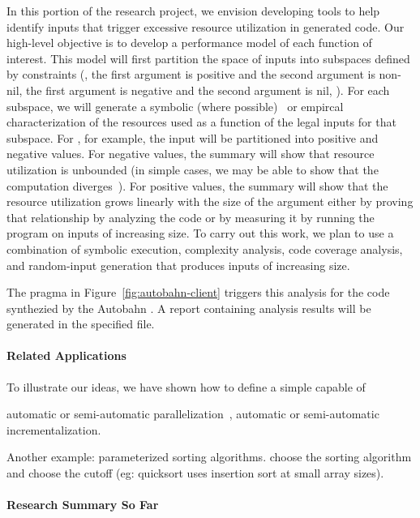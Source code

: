 In this portion of the \rasp{} research project, we envision
developing tools to help identify inputs that trigger excessive
resource utilization in generated code.
Our high-level objective is to develop a performance model of each
function of interest.   This model will first partition the space of inputs into
subspaces defined by constraints (\eg{}, the first argument is
positive and the second argument is non-nil, the first argument is
negative and the second argument is nil, \etc{}).  For each subspace,
we will generate a symbolic (where possible)~\cite{Hoffmann17} or
empircal~\cite{Goldsmith07}
characterization of the resources used as a function of the legal
inputs for that subspace.   For , for example, the input
will be partitioned into positive and negative values.  For negative
values, the summary will show that resource utilization is unbounded
(in simple cases, we may be able to show that the computation
diverges~\cite{Gupta08}).
For positive values, the summary will show that the resource
utilization grows linearly with the size of the argument either by
proving that relationship by analyzing the code or by measuring it by
running the program on inputs of increasing size.
To carry out this work, we plan to use a combination of symbolic
execution, complexity analysis, code coverage analysis, and
random-input generation that produces inputs of increasing size.


The  pragma in Figure~\ref{fig:autobahn-client}
triggers this analysis for the code synthezied by the Autobahn \rasp{}.
A report containing analysis results will be generated in the
specified file.

\paragraph*{Related Applications}
To illustrate our ideas, we have shown how to define a simple \rasp capable of

automatic or semi-automatic parallelization~\cite{implicit-parallel}, automatic or semi-automatic incrementalization.

Another example:  parameterized sorting algorithms.  choose the sorting algorithm and choose the cutoff
(eg: quicksort uses insertion sort at small array sizes).

\paragraph*{Research Summary So Far}



